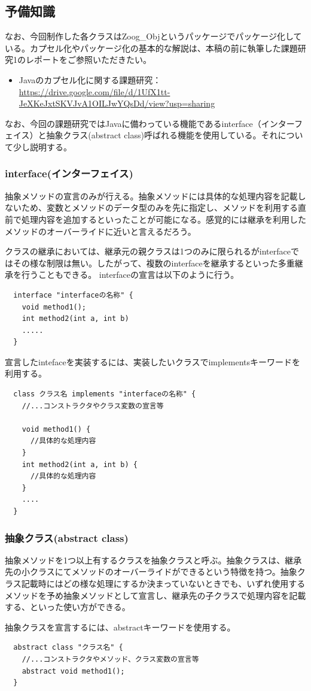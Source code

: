 \documentclass[dvipdfmx]{jsarticle}
\begin{document}
\subsection{予備知識}
なお、今回制作した各クラスはZoog\_Objというパッケージでパッケージ化している。カプセル化やパッケージ化の基本的な解説は、本稿の前に執筆した課題研究1のレポートをご参照いただきたい。
\begin{itemize}
  \item Javaのカプセル化に関する課題研究：\url{https://drive.google.com/file/d/1UfX1tt-JeXKeJxtSKVJvA1OILJwYQsDd/view?usp=sharing}
\end{itemize}
なお、今回の課題研究ではJavaに備わっている機能であるinterface（インターフェイス）と抽象クラス(abstract class)呼ばれる機能を使用している。それについて少し説明する。
\subsubsection{interface(インターフェイス)}
抽象メソッドの宣言のみが行える。抽象メソッドには具体的な処理内容を記載しないため、変数とメソッドのデータ型のみを先に指定し、メソッドを利用する直前で処理内容を追加するといったことが可能になる。感覚的には継承を利用したメソッドのオーバーライドに近いと言えるだろう。\par
クラスの継承においては、継承元の親クラスは1つのみに限られるがinterfaceではその様な制限は無い。したがって、複数のinterfaceを継承するといった多重継承を行うこともできる。
interfaceの宣言は以下のように行う。
\begin{verbatim}
  interface "interfaceの名称" {
    void method1();
    int method2(int a, int b)
    .....
  }
\end{verbatim}
宣言したintefaceを実装するには、実装したいクラスでimplementsキーワードを利用する。
\begin{verbatim}
  class クラス名 implements "interfaceの名称" {
    //...コンストラクタやクラス変数の宣言等

    void method1() {
      //具体的な処理内容
    }
    int method2(int a, int b) {
      //具体的な処理内容
    }
    ....
  }
\end{verbatim}
\subsubsection{抽象クラス(abstract class)}
抽象メソッドを1つ以上有するクラスを抽象クラスと呼ぶ。抽象クラスは、継承先の小クラスにてメソッドのオーバーライドができるという特徴を持つ。抽象クラス記載時にはどの様な処理にするか決まっていないときでも、いずれ使用するメソッドを予め抽象メソッドとして宣言し、継承先の子クラスで処理内容を記載する、といった使い方ができる。\par
抽象クラスを宣言するには、abstractキーワードを使用する。
\begin{verbatim}
  abstract class "クラス名" {
    //...コンストラクタやメソッド、クラス変数の宣言等
    abstract void method1();
  }
\end{verbatim}
\end{document}

